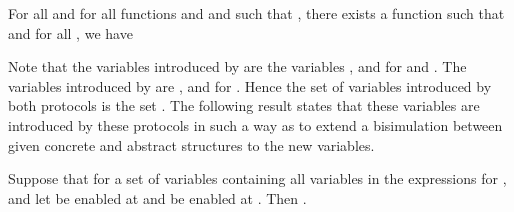 \documentclass[]{llncs}
\begin{document}
\begin{lemma} \label{lem:chaum} 
For all  and for all  functions   and  and  
such that , there exists a function  
such that  and
for all , we have  
\end{lemma} 




Note that the variables introduced by  are the variables ,  and  for  and .  
The variables introduced by  are ,  and  for . 
Hence the set of variables introduced by both protocols is the set  . 
The following result states that these variables are introduced by these protocols in such a way as to extend a bisimulation
between given concrete and abstract structures to the new variables. 

\begin{theorem} \label{thm:abstractdc}
Suppose that    for a set of variables  containing all variables in the expressions  for , 
and let  be enabled at  and  be enabled at . 
Then . 
\end{theorem} 
\end{document}
